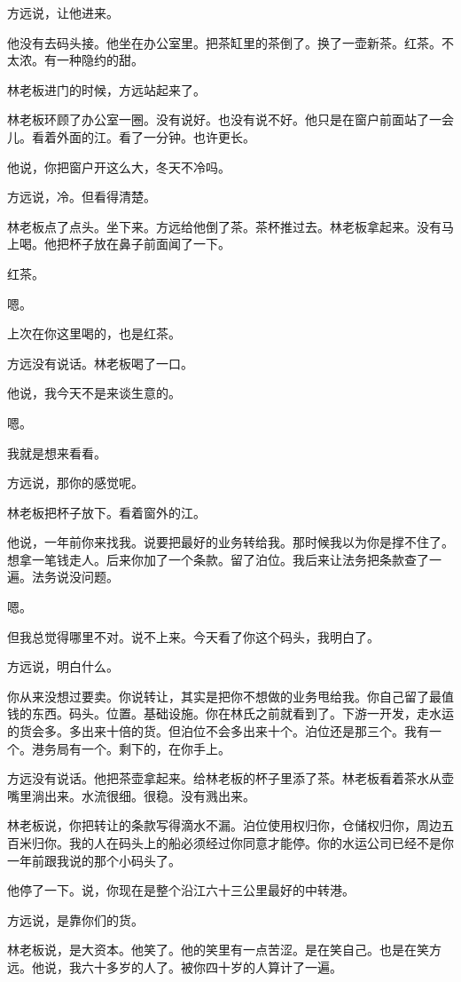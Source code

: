 \documentclass[UTF8,a5paper,11pt,openany]{ctexbook}
\begin{document}
方远说，让他进来。

他没有去码头接。他坐在办公室里。把茶缸里的茶倒了。换了一壶新茶。红茶。不太浓。有一种隐约的甜。

林老板进门的时候，方远站起来了。

林老板环顾了办公室一圈。没有说好。也没有说不好。他只是在窗户前面站了一会儿。看着外面的江。看了一分钟。也许更长。

他说，你把窗户开这么大，冬天不冷吗。

方远说，冷。但看得清楚。

林老板点了点头。坐下来。方远给他倒了茶。茶杯推过去。林老板拿起来。没有马上喝。他把杯子放在鼻子前面闻了一下。

红茶。

嗯。

上次在你这里喝的，也是红茶。

方远没有说话。林老板喝了一口。

他说，我今天不是来谈生意的。

嗯。

我就是想来看看。

方远说，那你的感觉呢。

林老板把杯子放下。看着窗外的江。

他说，一年前你来找我。说要把最好的业务转给我。那时候我以为你是撑不住了。想拿一笔钱走人。后来你加了一个条款。留了泊位。我后来让法务把条款查了一遍。法务说没问题。

嗯。

但我总觉得哪里不对。说不上来。今天看了你这个码头，我明白了。

方远说，明白什么。

你从来没想过要卖。你说转让，其实是把你不想做的业务甩给我。你自己留了最值钱的东西。码头。位置。基础设施。你在林氏之前就看到了。下游一开发，走水运的货会多。多出来十倍的货。但泊位不会多出来十个。泊位还是那三个。我有一个。港务局有一个。剩下的，在你手上。

方远没有说话。他把茶壶拿起来。给林老板的杯子里添了茶。林老板看着茶水从壶嘴里淌出来。水流很细。很稳。没有溅出来。

林老板说，你把转让的条款写得滴水不漏。泊位使用权归你，仓储权归你，周边五百米归你。我的人在码头上的船必须经过你同意才能停。你的水运公司已经不是你一年前跟我说的那个小码头了。

他停了一下。说，你现在是整个沿江六十三公里最好的中转港。

方远说，是靠你们的货。

林老板说，是大资本。他笑了。他的笑里有一点苦涩。是在笑自己。也是在笑方远。他说，我六十多岁的人了。被你四十岁的人算计了一遍。
\end{document}
